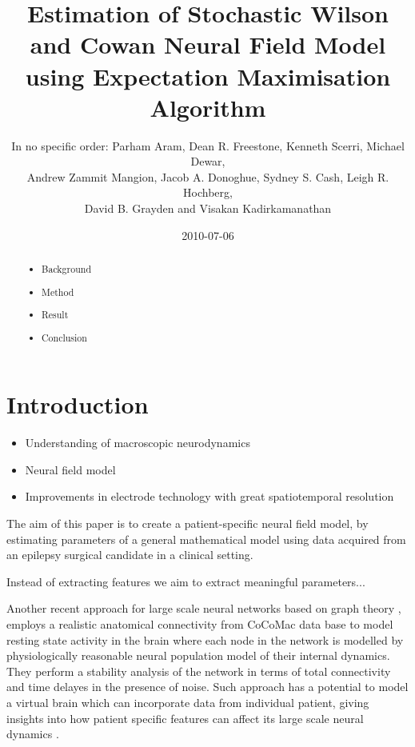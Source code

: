 \documentclass[]{article}
\title{Estimation of Stochastic Wilson and Cowan Neural Field Model using Expectation Maximisation Algorithm}
\author{In no specific order: Parham Aram, Dean R. Freestone, Kenneth Scerri, Michael Dewar,\\
 Andrew Zammit Mangion, Jacob A. Donoghue, Sydney S. Cash, Leigh R. Hochberg,\\
 David B. Grayden and Visakan Kadirkamanathan  }
\date{2010-07-06}
\newif\ifpdf
\begin{document}
\ifpdf
\DeclareGraphicsExtensions{.pdf, .jpg, .tif}
\else
{}
\fi

\maketitle


\begin{abstract}
	
	\begin{itemize}
		\item Background
		\item Method
		\item Result
		\item Conclusion
	\end{itemize}
\end{abstract}

\section{Introduction}
\begin{itemize}
	\item Understanding of macroscopic neurodynamics
	\item Neural field model
	\item Improvements in electrode technology with great spatiotemporal resolution


\end{itemize}
The aim of this paper is to create a patient-specific neural field model, by estimating parameters of a general mathematical model using data acquired from an epilepsy surgical candidate in a clinical setting. 

Instead of extracting features we aim to extract meaningful parameters...


Another recent approach for large scale neural networks based on graph theory \cite{Albert2002,Bang-Jensen2010}, employs a realistic anatomical connectivity from CoCoMac data base \cite{Kotter2004} to model resting state activity in the brain \cite{Ghosh2008,Deco2009} where each node in the network is modelled by physiologically reasonable neural population model of their internal dynamics. They perform a stability analysis of the network in terms of total connectivity and time delayes in the presence of noise. Such approach has a potential to model a virtual brain which can incorporate data from individual patient, giving insights into how patient specific features can affect its large scale neural dynamics \cite{Jirsa2010,Deco2010}.
\end{document}
